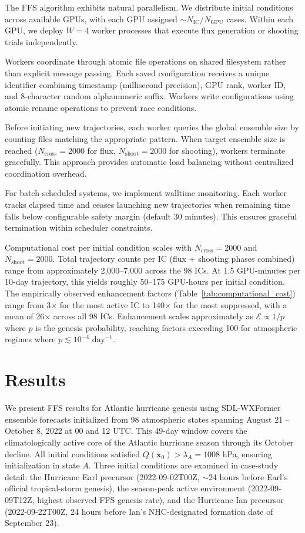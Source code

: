 \documentclass[11pt]{article}
\begin{document}
The FFS algorithm exhibits natural parallelism. We distribute initial conditions across available GPUs, with each GPU assigned $\sim N_{\text{IC}}/N_{\text{GPU}}$ cases. Within each GPU, we deploy $W = 4$ worker processes that execute flux generation or shooting trials independently.

Workers coordinate through atomic file operations on shared filesystem rather than explicit message passing. Each saved configuration receives a unique identifier combining timestamp (millisecond precision), GPU rank, worker ID, and 8-character random alphanumeric suffix. Workers write configurations using atomic rename operations to prevent race conditions.

Before initiating new trajectories, each worker queries the global ensemble size by counting files matching the appropriate pattern. When target ensemble size is reached ($N_{\text{cross}} = 2000$ for flux, $N_{\text{shoot}} = 2000$ for shooting), workers terminate gracefully. This approach provides automatic load balancing without centralized coordination overhead.

For batch-scheduled systems, we implement walltime monitoring. Each worker tracks elapsed time and ceases launching new trajectories when remaining time falls below configurable safety margin (default 30 minutes). This ensures graceful termination within scheduler constraints.

Computational cost per initial condition scales with $N_{\text{cross}} = 2000$ and $N_{\text{shoot}} = 2000$. Total trajectory counts per IC (flux + shooting phases combined) range from approximately 2,000--7,000 across the 98 ICs. At 1.5 GPU-minutes per 10-day trajectory, this yields roughly 50--175 GPU-hours per initial condition. The empirically observed enhancement factors (Table~\ref{tab:computational_cost}) range from 3$\times$ for the most active IC to 140$\times$ for the most suppressed, with a mean of 26$\times$ across all 98 ICs. Enhancement scales approximately as $\mathcal{E} \propto 1/p$ where $p$ is the genesis probability, reaching factors exceeding 100 for atmospheric regimes where $p \lesssim 10^{-4}$ day$^{-1}$.
\section{Results}

We present FFS results for Atlantic hurricane genesis using SDL-WXFormer ensemble forecasts initialized from 98 atmospheric states spanning August 21 -- October 8, 2022 at 00 and 12 UTC. This 49-day window covers the climatologically active core of the Atlantic hurricane season through its October decline. All initial conditions satisfied $Q(\mathbf{x}_0) > \lambda_A = 1008$ hPa, ensuring initialization in state $A$. Three initial conditions are examined in case-study detail: the Hurricane Earl precursor (2022-09-02T00Z, $\sim$24 hours before Earl's official tropical-storm genesis), the season-peak active environment (2022-09-09T12Z, highest observed FFS genesis rate), and the Hurricane Ian precursor (2022-09-22T00Z, 24 hours before Ian's NHC-designated formation date of September 23).
\end{document}

